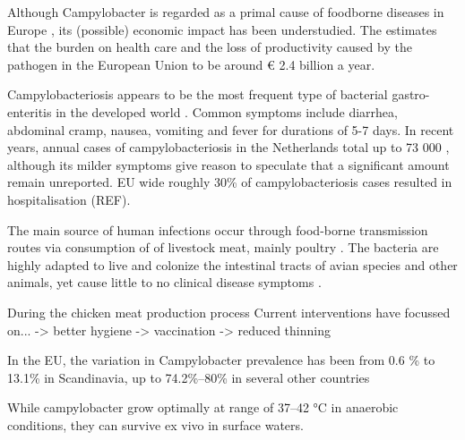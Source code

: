 \iffalse
1.	Establish field  -> Z
    a.	Societal relevance
2.	Outline problem in the field (Elias)
    a.	Scientific relevance
3.	Present solution to problem in the field
    a.	Problem statement/research question -> Z
    b.	Explain relevance of simulation method (Elias) considering the problem
4.	Reading guide -> Z

Target: 1000 words\
♫♪.ılılıll|̲̅̅●̲̅̅|̲̅̅=̲̅̅|̲̅̅●̲̅̅|llılılı.♫♪
\fi

Although Campylobacter is regarded as a primal cause of foodborne diseases in Europe \parencite{european_food_safety_authority_european_2019}
, its (possible) economic impact has been understudied. The \citeauthor{european_food_safety_authority_campylobacter_nodate} estimates that the burden on health care and the loss of productivity caused by the pathogen in the European Union to be around \euro{} 2.4 billion a year. %

Campylobacteriosis appears to be the most frequent type of bacterial gastro-enteritis in the developed world \cite{fouts_major_2005}. Common symptoms include diarrhea, abdominal cramp, nausea, vomiting and fever for durations of 5-7 days. In recent years, annual cases of campylobacteriosis in the Netherlands total up to 73 000 \cite{lagerweij_disease_2020}, although its milder symptoms give reason to speculate that a significant amount remain unreported\cite{koutsoumanis_update_2020}. EU wide roughly 30\% of campylobacteriosis cases resulted in hospitalisation (REF).

The main source of human infections occur through food-borne transmission routes via consumption of of livestock meat, mainly poultry \cite{wilson_tracing_2008}. The bacteria are highly adapted to live and colonize the intestinal tracts of avian species and other animals, yet cause little to no clinical disease symptoms \cite{saif_diseases_2008}. 

During the chicken meat production process
Current interventions have focussed on...
-> better hygiene
-> vaccination
-> reduced thinning

In the EU, the variation in Campylobacter prevalence has been from 0.6 \% to 13.1\% in Scandinavia, up to 74.2\%–80\% in  several  other  countries

While campylobacter grow optimally at range of 37–42 °C \cite{bronowski_role_2014} in anaerobic conditions, they can survive ex vivo in surface waters.

